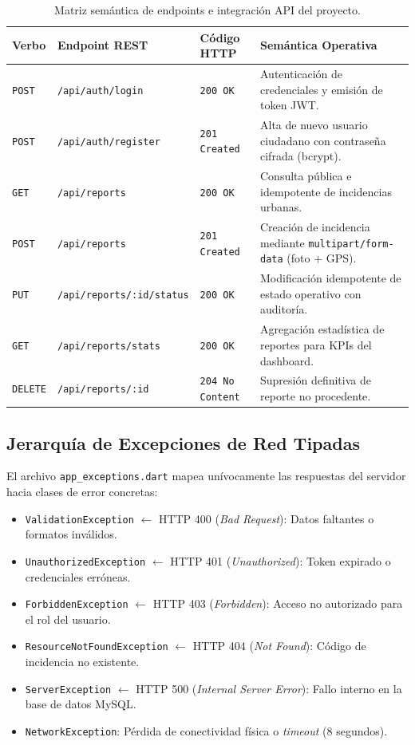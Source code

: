 \documentclass[12pt,a4paper]{article}
\begin{document}
\begin{table}[H]
\centering
\small
\begin{tabularx}{\textwidth}{p{1.8cm} p{4.2cm} p{2.2cm} X}
\toprule
\rowcolor{tableHeader}
\textbf{Verbo} & \textbf{Endpoint REST} & \textbf{Código HTTP} & \textbf{Semántica Operativa} \\
\midrule
\texttt{POST} & \texttt{/api/auth/login} & \texttt{200 OK} & Autenticación de credenciales y emisión de token JWT. \\
\texttt{POST} & \texttt{/api/auth/register} & \texttt{201 Created} & Alta de nuevo usuario ciudadano con contraseña cifrada (bcrypt). \\
\texttt{GET} & \texttt{/api/reports} & \texttt{200 OK} & Consulta pública e idempotente de incidencias urbanas. \\
\texttt{POST} & \texttt{/api/reports} & \texttt{201 Created} & Creación de incidencia mediante \texttt{multipart/form-data} (foto + GPS). \\
\texttt{PUT} & \texttt{/api/reports/:id/status} & \texttt{200 OK} & Modificación idempotente de estado operativo con auditoría. \\
\texttt{GET} & \texttt{/api/reports/stats} & \texttt{200 OK} & Agregación estadística de reportes para KPIs del dashboard. \\
\texttt{DELETE} & \texttt{/api/reports/:id} & \texttt{204 No Content} & Supresión definitiva de reporte no procedente. \\
\bottomrule
\end{tabularx}
\caption{Matriz semántica de endpoints e integración API del proyecto.}
\label{tab:api_endpoints}
\end{table}

\subsection{Jerarquía de Excepciones de Red Tipadas}
El archivo \texttt{app\_exceptions.dart} mapea unívocamente las respuestas del servidor hacia clases de error concretas:
\begin{itemize}[leftmargin=*]
    \item \texttt{ValidationException} $\leftarrow$ HTTP 400 (\textit{Bad Request}): Datos faltantes o formatos inválidos.
    \item \texttt{UnauthorizedException} $\leftarrow$ HTTP 401 (\textit{Unauthorized}): Token expirado o credenciales erróneas.
    \item \texttt{ForbiddenException} $\leftarrow$ HTTP 403 (\textit{Forbidden}): Acceso no autorizado para el rol del usuario.
    \item \texttt{ResourceNotFoundException} $\leftarrow$ HTTP 404 (\textit{Not Found}): Código de incidencia no existente.
    \item \texttt{ServerException} $\leftarrow$ HTTP 500 (\textit{Internal Server Error}): Fallo interno en la base de datos MySQL.
    \item \texttt{NetworkException}: Pérdida de conectividad física o \textit{timeout} (8 segundos).
\end{itemize}
\end{document}
